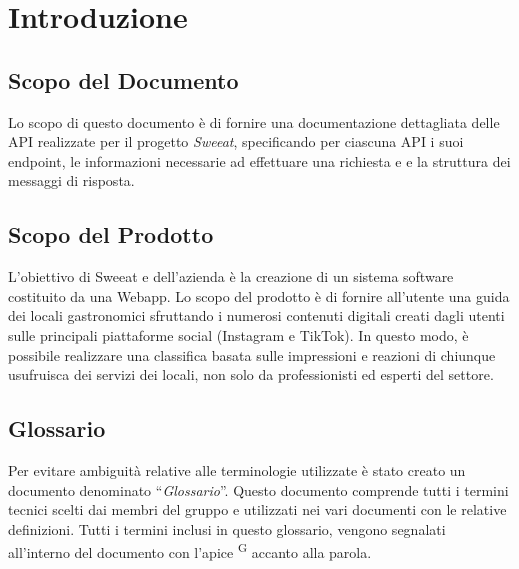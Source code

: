 \section{Introduzione}

\subsection{Scopo del Documento}
Lo scopo di questo documento è di fornire una documentazione dettagliata delle API realizzate per il progetto \textit{Sweeat}, specificando per ciascuna API i suoi endpoint, le informazioni necessarie ad effettuare una richiesta e e la struttura dei messaggi di risposta.


\subsection{Scopo del Prodotto}
L’obiettivo di Sweeat e dell’azienda \zd è la creazione di un sistema software costituito da una Webapp. Lo scopo del prodotto è di fornire all’utente una guida dei locali gastronomici sfruttando i numerosi contenuti digitali creati dagli utenti sulle principali piattaforme social (Instagram e TikTok).
In questo modo, è possibile realizzare una classifica basata sulle impressioni e reazioni di chiunque usufruisca dei servizi dei locali, non solo da professionisti ed esperti del settore.


\subsection{Glossario}
Per evitare ambiguità relative alle terminologie utilizzate è stato creato un documento denominato “\textit{Glossario}”. Questo documento comprende tutti i termini tecnici scelti dai membri del gruppo e utilizzati nei vari documenti con le relative definizioni. Tutti i termini inclusi in questo glossario, vengono segnalati all'interno del documento con l'apice \textsuperscript{G} accanto alla parola.